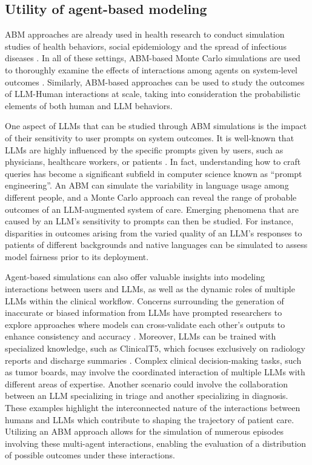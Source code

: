 \documentclass[10pt]{article}
\begin{document}
\begin{multicols}{2}
\section{Utility of agent-based modeling}
ABM approaches are already used in health research to conduct simulation studies of health behaviors, social epidemiology and the spread of infectious diseases \cite{tracy2018agent}. In all of these settings, ABM-based Monte Carlo simulations are used to thoroughly examine the effects of interactions among agents on system-level outcomes \cite{bonabeau2002agent}. Similarly, ABM-based approaches can be used to study the outcomes of LLM-Human interactions at scale, taking into consideration the probabilistic elements of both human and LLM behaviors.

One aspect of LLMs that can be studied through ABM simulations is the impact of their sensitivity to user prompts on system outcomes. It is well-known that LLMs are highly influenced by the specific prompts given by users, such as physicians, healthcare workers, or patients \cite{lu2022fantastically}. In fact, understanding how to craft queries has become a significant subfield in computer science known as “prompt engineering”. An ABM can simulate the variability in language usage among different people, and a Monte Carlo approach can reveal the range of probable outcomes of an LLM-augmented system of care. Emerging phenomena that are caused by an LLM’s sensitivity to prompts can then be studied. For instance, disparities in outcomes arising from the varied quality of an LLM’s responses to patients of different backgrounds and native languages can be simulated to assess model fairness prior to its deployment.

Agent-based simulations can also offer valuable insights into modeling interactions between users and LLMs, as well as the dynamic roles of multiple LLMs within the clinical workflow. Concerns surrounding the generation of inaccurate or biased information from LLMs have prompted researchers to explore approaches where models can cross-validate each other’s outputs to enhance consistency and accuracy \cite{dash2023evaluation,wang2022self}. Moreover, LLMs can be trained with specialized knowledge, such as ClinicalT5, which focuses exclusively on radiology reports and discharge summaries \cite{lehman2023clinical}. Complex clinical decision-making tasks, such as tumor boards, may involve the coordinated interaction of multiple LLMs with different areas of expertise. Another scenario could involve the collaboration between an LLM specializing in triage and another specializing in diagnosis. These examples highlight the interconnected nature of the interactions between humans and LLMs which contribute to shaping the trajectory of patient care. Utilizing an ABM approach allows for the simulation of numerous episodes involving these multi-agent interactions, enabling the evaluation of a distribution of possible outcomes under these interactions.


\end{multicols}
\end{document}
